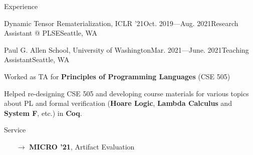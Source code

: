 \documentclass{resume}
\begin{document}
\begin{rSection}{Experience}
\begin{rSubsection}{Dynamic Tensor Rematerialization, ICLR '21}{Oct. 2019---Aug. 2021}{Research Assistant @ PLSE}{Seattle, WA}
        \end{rSubsection}
        \vspace{-5pt}
		\begin{rSubsection}{Paul G. Allen School, University of Washington}{Mar. 2021---June. 2021}{Teaching Assistant}{Seattle, WA}
			\item Worked as TA for \textbf{Principles of Programming Languages} (CSE 505)
			\item Helped re-designing CSE 505 and developing course materials for various topics about PL and formal verification (\textbf{Hoare Logic}, \textbf{Lambda Calculus} and \textbf{System F}, etc.) in \textbf{Coq}.
		\end{rSubsection}
    \end{rSection}
	\vspace{-5pt}
	\begin{rSection}{Service}
    	\begin{enumerate}
    		\setlength{\itemsep}{1pt}
            \setlength{\parskip}{0pt}
    		\setlength{\parsep}{0pt}
    		\item[$\rightarrow$] \textbf{MICRO '21}, Artifact Evaluation
    	\end{enumerate}
	\end{rSection}
\end{document}
